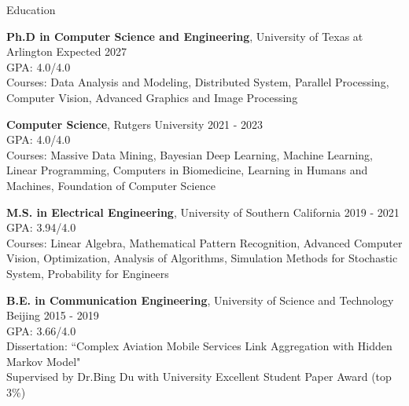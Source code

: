 \documentclass{resume} %
\begin{document}




\vspace{-4pt}
\begin{rSection}{Education}

{\bf Ph.D in Computer Science and Engineering}, University of Texas at Arlington \hfill {Expected 2027}\\
GPA: 4.0/4.0 \\
Courses: Data Analysis and Modeling, Distributed System, Parallel Processing, Computer Vision, Advanced Graphics and Image Processing

{\bf Computer Science}, Rutgers University \hfill {2021 - 2023}\\
GPA: 4.0/4.0 \\
Courses: Massive Data Mining, Bayesian Deep Learning, Machine Learning, Linear Programming, Computers in Biomedicine, Learning in Humans and Machines, Foundation of Computer Science

{\bf M.S. in Electrical Engineering}, University of Southern California \hfill {2019 - 2021}\\
GPA: 3.94/4.0 \\
Courses: Linear Algebra, Mathematical Pattern Recognition, Advanced Computer Vision, Optimization, Analysis of Algorithms, Simulation Methods for Stochastic System, Probability for Engineers

{\bf B.E. in Communication Engineering}, University of Science and Technology Beijing \hfill {2015 - 2019} \\
GPA: 3.66/4.0 \\
Dissertation: ``Complex Aviation Mobile Services Link Aggregation with Hidden Markov Model"\\
Supervised by Dr.Bing Du with University Excellent Student Paper Award (top 3\%)


\end{rSection}
\end{document}
